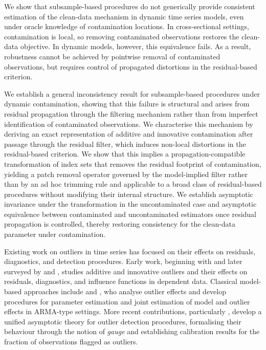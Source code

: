 \documentclass[12pt]{article}
\numberwithin{equation}{section}
\begin{document}
We show that subsample-based procedures do not generically provide consistent estimation of the clean-data mechanism in dynamic time series models, even under oracle knowledge of contamination locations. 
In cross-sectional settings, contamination is local, so removing contaminated observations restores the clean-data objective. 
In dynamic models, however, this equivalence fails. 
As a result, robustness cannot be achieved by pointwise removal of contaminated observations, but requires control of propagated distortions in the residual-based criterion.

We establish a general inconsistency result for subsample-based procedures under dynamic contamination, showing that this failure is structural and arises from residual propagation through the filtering mechanism rather than from imperfect identification of contaminated observations. 
We characterise this mechanism by deriving an exact representation of additive and innovative contamination after passage through the residual filter, which induces non-local distortions in the residual-based criterion. 
We show that this implies a propagation-compatible transformation of index sets that removes the residual footprint of contamination, yielding a patch removal operator governed by the model-implied filter rather than by an ad hoc trimming rule and applicable to a broad class of residual-based procedures without modifying their internal structure. 
We establish asymptotic invariance under the transformation in the uncontaminated case and asymptotic equivalence between contaminated and uncontaminated estimators once residual propagation is controlled, thereby restoring consistency for the clean-data parameter under contamination.

Existing work on outliers in time series has focused on their effects on residuals, diagnostics, and detection procedures.
Early work, beginning with \citet{fox_outliers_1972} and later surveyed by \citet{MARTIN1979147} and \citet{MaYo86}, studies additive and innovative outliers and their effects on residuals, diagnostics, and influence functions in dependent data.
Classical model-based approaches include \citet{chang_estimation_1988} and \citet{ChenLiu1993}, who analyse outlier effects and develop procedures for parameter estimation and joint estimation of model and outlier effects in ARMA-type settings.
More recent contributions, particularly \citet{JohansenNielsen2016}, develop a unified asymptotic theory for outlier detection procedures, formalising their behaviour through the notion of \emph{gauge} and establishing calibration results for the fraction of observations flagged as outliers. 
\end{document}

